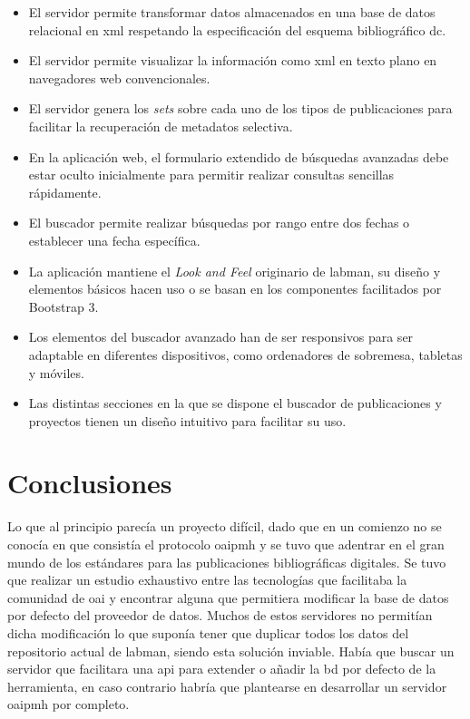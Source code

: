 \begin{itemize}
	\item El servidor permite transformar datos almacenados en una base de datos relacional en \acrshort{xml} respetando la especificación del esquema bibliográfico \acrshort{dc}.
	\item El servidor permite visualizar la información como \acrshort{xml} en texto plano en navegadores web convencionales.
	\item El servidor genera los \textit{sets} sobre cada uno de los tipos de publicaciones para facilitar la recuperación de metadatos selectiva.
	\item En la aplicación web, el formulario extendido de búsquedas avanzadas debe estar oculto inicialmente para permitir realizar consultas sencillas rápidamente.
	\item El buscador permite realizar búsquedas por rango entre dos fechas o establecer una fecha específica.
	\item La aplicación mantiene el \textit{Look and Feel} originario de \acrshort{labman}, su diseño y elementos básicos hacen uso o se basan en los componentes facilitados por Bootstrap 3.
	\item Los elementos del buscador avanzado han de ser responsivos para ser adaptable en diferentes dispositivos, como ordenadores de sobremesa, tabletas y móviles.
	\item Las distintas secciones en la que se dispone el buscador de publicaciones y proyectos tienen un diseño intuitivo para facilitar su uso. 
\end{itemize}

\section{Conclusiones}

Lo que al principio parecía un proyecto difícil, dado que en un comienzo no se conocía en que consistía el protocolo \acrshort{oaipmh} y se tuvo que adentrar en el gran mundo de los estándares para las publicaciones bibliográficas digitales. Se tuvo que realizar un estudio exhaustivo entre las tecnologías que facilitaba la comunidad de \acrshort{oai} y encontrar alguna que permitiera modificar la base de datos por defecto del proveedor de datos. Muchos de estos servidores no permitían dicha modificación lo que suponía tener que duplicar todos los datos del repositorio actual de \acrshort{labman}, siendo esta solución inviable. Había que buscar un servidor que facilitara una \acrshort{api} para extender o añadir la \acrshort{bd} por defecto de la herramienta, en caso contrario habría que plantearse en desarrollar un servidor \acrshort{oaipmh} por completo.

